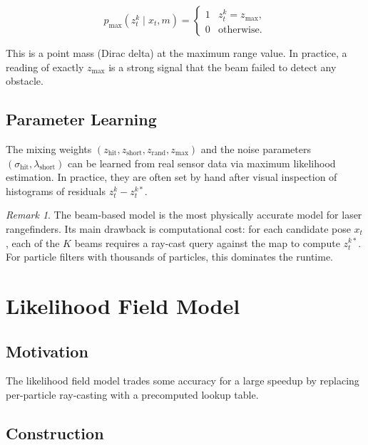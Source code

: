 \documentclass[11pt,a4paper]{article}
\theoremstyle{definition}
\theoremstyle{plain}
\theoremstyle{remark}
\newtheorem*{remark}{Remark}
\begin{document}
\[
    p_{\mathrm{max}}(z_t^k \mid x_t, m) =
    \begin{cases}
        1 & z_t^k = z_{\mathrm{max}}, \\ %
        0 & \text{otherwise.}
    \end{cases}
\]

This is a point mass (Dirac delta) at the maximum range value. In practice, a reading of exactly $z_{\mathrm{max}}$ is a strong signal that the beam failed to detect any obstacle. %

\subsection{Parameter Learning}

The mixing weights $(z_{\mathrm{hit}}, z_{\mathrm{short}}, z_{\mathrm{rand}}, z_{\mathrm{max}})$ and the noise parameters $(\sigma_{\mathrm{hit}}, \lambda_{\mathrm{short}})$ can be learned from real sensor data via maximum likelihood estimation. In practice, they are often set by hand after visual inspection of histograms of residuals $z_t^k - z_t^{k*}$. %

\begin{remark}
The beam-based model is the most physically accurate model for laser rangefinders. Its main drawback is computational cost: for each candidate pose $x_t$, each of the $K$ beams requires a ray-cast query against the map to compute $z_t^{k*}$. For particle filters with thousands of particles, this dominates the runtime.
\end{remark}

\section{Likelihood Field Model}

\subsection{Motivation}

The likelihood field model trades some accuracy for a large speedup by replacing per-particle ray-casting with a precomputed lookup table.

\subsection{Construction}
\end{document}
